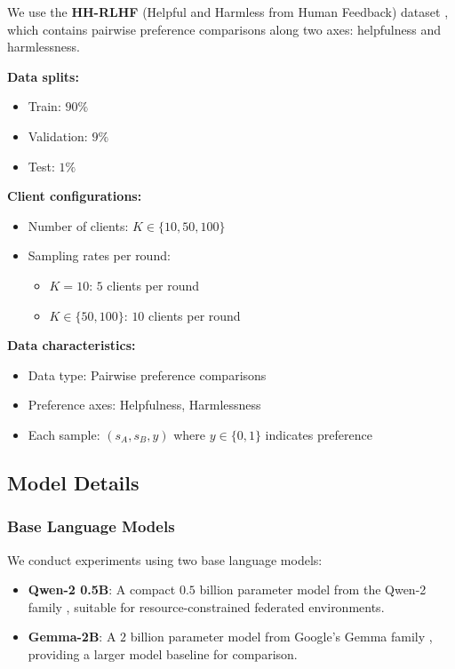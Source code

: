 We use the \textbf{HH-RLHF} (Helpful and Harmless from Human Feedback) dataset \citep{bai2022training}, which contains pairwise preference comparisons along two axes: helpfulness and harmlessness.

\textbf{Data splits:}
\begin{itemize}
    \item Train: $90\%$
    \item Validation: $9\%$
    \item Test: $1\%$
\end{itemize}

\textbf{Client configurations:}
\begin{itemize}
    \item Number of clients: $K \in \{10, 50, 100\}$
    \item Sampling rates per round:
    \begin{itemize}
        \item $K=10$: $5$ clients per round
        \item $K \in \{50, 100\}$: $10$ clients per round
    \end{itemize}
\end{itemize}

\textbf{Data characteristics:}
\begin{itemize}
    \item Data type: Pairwise preference comparisons
    \item Preference axes: Helpfulness, Harmlessness
    \item Each sample: $(s_A, s_B, y)$ where $y \in \{0, 1\}$ indicates preference
\end{itemize}

\subsection{Model Details}

\subsubsection{Base Language Models}

We conduct experiments using two base language models:

\begin{itemize}
    \item \textbf{Qwen-2 0.5B}: A compact $0.5$ billion parameter model from the Qwen-2 family \citep{yang2024qwen2}, suitable for resource-constrained federated environments.
    \item \textbf{Gemma-2B}: A $2$ billion parameter model from Google's Gemma family \citep{gemma2024gemma}, providing a larger model baseline for comparison.
\end{itemize}

